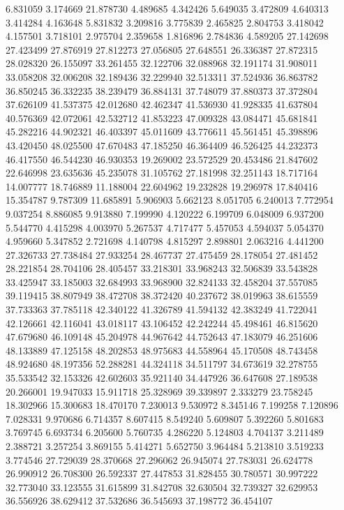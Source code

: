 6.831059
3.174669
21.878730
4.489685
4.342426
5.649035
3.472809
4.640313
3.414284
4.163648
5.831832
3.209816
3.775839
2.465825
2.804753
3.418042
4.157501
3.718101
2.975704
2.359658
1.816896
2.784836
4.589205
27.142698
27.423499
27.876919
27.812273
27.056805
27.648551
26.336387
27.872315
28.028320
26.155097
33.261455
32.122706
32.088968
32.191174
31.908011
33.058208
32.006208
32.189436
32.229940
32.513311
37.524936
36.863782
36.850245
36.332235
38.239479
36.884131
37.748079
37.880373
37.372804
37.626109
41.537375
42.012680
42.462347
41.536930
41.928335
41.637804
40.576369
42.072061
42.532712
41.853223
47.009328
43.084471
45.681841
45.282216
44.902321
46.403397
45.011609
43.776611
45.561451
45.398896
43.420450
48.025500
47.670483
47.185250
46.364409
46.526425
44.232373
46.417550
46.544230
46.930353
19.269002
23.572529
20.453486
21.847602
22.646998
23.635636
45.235078
31.105762
27.181998
32.251143
18.717164
14.007777
18.746889
11.188004
22.604962
19.232828
19.296978
17.840416
15.354787
9.787309
11.685891
5.906903
5.662123
8.051705
6.240013
7.772954
9.037254
8.886085
9.913880
7.199990
4.120222
6.199709
6.048009
6.937200
5.544770
4.415298
4.003970
5.267537
4.717477
5.457053
4.594037
5.054370
4.959660
5.347852
2.721698
4.140798
4.815297
2.898801
2.063216
4.441200
27.326733
27.738484
27.933254
28.467737
27.475459
28.178054
27.481452
28.221854
28.704106
28.405457
33.218301
33.968243
32.506839
33.543828
33.425947
33.185003
32.684993
33.968900
32.824133
32.458204
37.557085
39.119415
38.807949
38.472708
38.372420
40.237672
38.019963
38.615559
37.733363
37.785118
42.340122
41.326789
41.594132
42.383249
41.722041
42.126661
42.116041
43.018117
43.106452
42.242244
45.498461
46.815620
47.679680
46.109148
45.204978
44.967642
44.752643
47.183079
46.251606
48.133889
47.125158
48.202853
48.975683
44.558964
45.170508
48.743458
48.924680
48.197356
52.288281
44.324118
34.511797
34.673619
32.278755
35.533542
32.153326
42.602603
35.921140
34.447926
36.647608
27.189538
20.266001
19.947033
15.911718
25.328969
39.339897
2.333279
23.758245
18.302966
15.300683
18.470170
7.230013
9.530972
8.345146
7.199258
7.120896
7.028331
9.970686
6.714357
8.607415
8.549240
5.609807
5.392260
5.801683
3.769745
6.693734
6.205600
5.760735
4.286220
5.124803
4.704137
3.211489
2.388721
3.257254
3.869155
5.414271
5.652750
3.964484
5.213810
3.519233
3.774546
27.729039
28.370668
27.296062
26.945074
27.783031
26.624778
26.990912
26.708300
26.592337
27.447853
31.828455
30.780571
30.997222
32.773040
33.123555
31.615899
31.842708
32.630504
32.739327
32.629953
36.556926
38.629412
37.532686
36.545693
37.198772
36.454107
